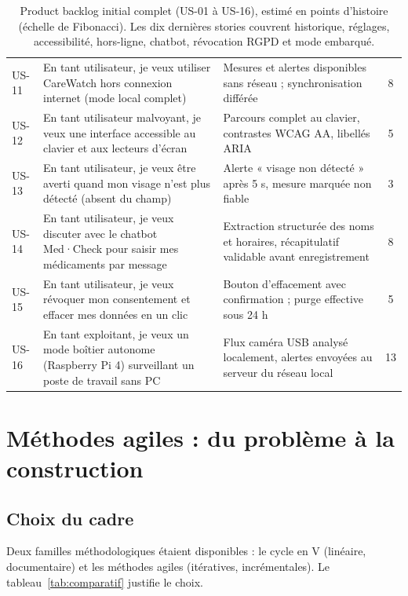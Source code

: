 \documentclass[11pt,a4paper]{article}
\renewcommand{\arraystretch}{1.45}
\begin{document}
\begin{table}[!htbp]
\begin{tabularx}{\linewidth}{l X p{6.6cm} c}
US-11 & En tant utilisateur, je veux utiliser CareWatch hors connexion internet (mode local
 complet) & Mesures et alertes disponibles sans réseau ; synchronisation différée & 8 \\
US-12 & En tant utilisateur malvoyant, je veux une interface accessible au clavier et aux
 lecteurs d'écran & Parcours complet au clavier, contrastes WCAG AA, libellés ARIA & 5 \\
US-13 & En tant utilisateur, je veux être averti quand mon visage n'est plus détecté (absent
 du champ) & Alerte « visage non détecté » après 5 s, mesure marquée non fiable & 3 \\
US-14 & En tant utilisateur, je veux discuter avec le chatbot Med·Check pour saisir mes
 médicaments par message & Extraction structurée des noms et horaires, récapitulatif
 validable avant enregistrement & 8 \\
US-15 & En tant utilisateur, je veux révoquer mon consentement et effacer mes données en un
 clic & Bouton d'effacement avec confirmation ; purge effective sous 24 h & 5 \\
US-16 & En tant exploitant, je veux un mode boîtier autonome (Raspberry Pi 4) surveillant un
 poste de travail sans PC & Flux caméra USB analysé localement, alertes envoyées au serveur
 du réseau local & 13 \\
\bottomrule
\end{tabularx}
\renewcommand{\arraystretch}{1.45}
\caption{Product backlog initial complet (US-01 à US-16), estimé en points d'histoire
(échelle de Fibonacci). Les dix dernières stories couvrent historique, réglages, accessibilité,
hors-ligne, chatbot, révocation RGPD et mode embarqué.}
\label{tab:backlog}
\end{table}

\section{Méthodes agiles : du problème à la construction}
\label{sec:agile}

\subsection{Choix du cadre}
Deux familles méthodologiques étaient disponibles : le cycle en V (linéaire, documentaire) et les
méthodes agiles (itératives, incrémentales). Le tableau~\ref{tab:comparatif} justifie le choix.
\end{document}
